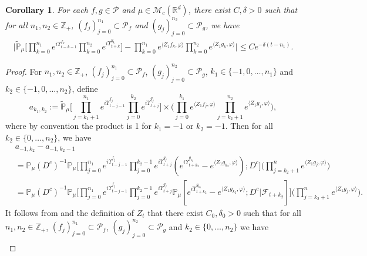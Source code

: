 \documentclass[12pt,a4paper]{amsart}
\theoremstyle{plain}
\newtheorem{cor}[thm]{Corollary}
\theoremstyle{definition}
\numberwithin{equation}{section}
\begin{document}
\begin{cor}
  \label{cor:MI}
For each  $f,g\in \mathcal P$ and $\mu\in \mathcal M_c(\mathbb R^d)$, there exist $C,\delta>0$ such that for
all $n_1,n_2 \in \mathbb Z_+$, $(f_j)_{j=0}^{n_1}\subset \mathcal P_f$ and $(g_j)_{j=0}^{n_2}\subset \mathcal P_g$, we have
\begin{align}
  \label{32corollary}
  \Big|\mathbb{\widetilde{P}}_{\mu}\Big[\prod_{k=0}^{n_1}e^{i \Upsilon^{f_k}_{t-k-1}}\prod_{k=0}^{n_2}e^{i \Upsilon^{g_k}_{t+k} }\Big]-\prod_{k=0}^{n_1} e^{\langle Z_1f_k, \varphi\rangle}\prod_{k=0}^{n_2} e^{\langle Z_1g_k, \varphi\rangle}\Big|\leq C e^{-\delta (t-n_1)}.
\end{align}
\end{cor}
\begin{proof}
For $n_1,n_2 \in \mathbb Z_+$, $(f_j)_{j=0}^{n_1}\subset \mathcal P_f$, $(g_j)_{j=0}^{n_2}\subset \mathcal P_g$, $k_1 \in \{-1,0,\dots,n_1\}$ and $k_2 \in \{-1,0,\dots,n_2\}$,  define
  \[
    a_{k_1,k_2}
    :=  \mathbb{\widetilde{P}}_{\mu}\Big[\prod_{j=k_1+1}^{n_1} e^{i\Upsilon_{t-j-1}^{f_j}}\prod_{j=0}^{k_2}e^{i\Upsilon_{t+j}^{g_j}}\Big] \times \Big(\prod_{j=0}^{k_1}e^{\langle Z_1 f_j, \varphi\rangle}\prod_{j=k_2+1}^{n_2} e^{ \langle Z_1g_j,\varphi \rangle} \Big),
  \]
 where by convention the product is 1 for $k_1=-1$ or $k_2 = -1$.
  Then for all  $k_2 \in \{0,\dots,n_2\}$, we have
  \begin{align}
    & a_{-1,k_2} - a_{-1,k_2-1}\\
     & =\mathbb{P}_{\mu}(D^c)^{-1} \mathbb{P}_{\mu}\Big[\prod_{j=0}^{n_1}e^{i\Upsilon_{t-j-1}^{f_j}}\prod_{j=0}^{k_2-1} e^{i\Upsilon_{t+j}^{g_j}}(e^{i\Upsilon^{g_{k_2}}_{t+k_2}}-e^{\langle Z_1g_{k_2}, \varphi\rangle});D^c\Big] \Big(\prod_{j=k_2+1}^n e^{\langle Z_1g_j, \varphi\rangle}\Big)\\
    & =\mathbb{P}_{\mu}(D^c)^{-1} \mathbb{P}_{\mu}\Big[\prod_{j=0}^{n_1}e^{i\Upsilon_{t-j-1}^{f_j}}\prod_{j=0}^{k_2-1} e^{i\Upsilon_{t+j}^{g_j}}\mathbb P_\mu[e^{i\Upsilon^{g_{k_2}}_{t+k_2}}-e^{\langle Z_1g_{k_2}, \varphi\rangle}; D^c|\mathscr F_{t+k_2}] \Big] \Big(\prod_{j=k_2+1}^{n}e^{\langle Z_1g_j, \varphi\rangle}\Big).
  \end{align}
It follows from \cite[Lemma 2.8 and Proposition 3.5]{RenSongSunZhao2019Stable} and the definition of $Z_t$ that
  there exist $C_0,\delta_0 >0$ such that for all $n_1,n_2 \in \mathbb Z_+$, $(f_j)_{j=0}^{n_1}\subset \mathcal P_f$, $(g_j)_{j=0}^{n_2}\subset \mathcal P_g$ and $k_2 \in \{0,\dots,n_2\}$ we have
\begin{align}

\end{align}
\end{proof}
\end{document}
